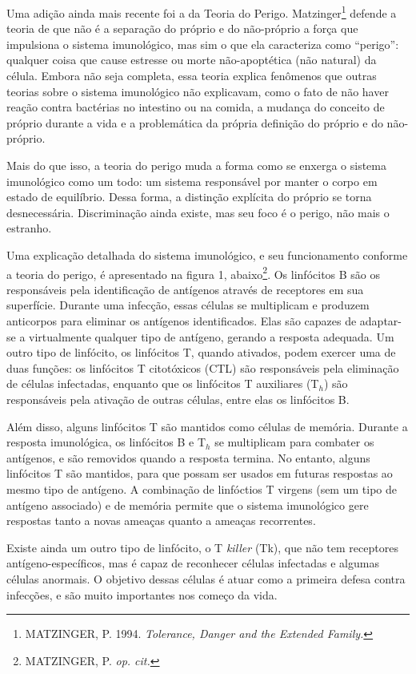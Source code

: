 \documentclass{iiufrgs}
\begin{document}
Uma adição ainda mais recente foi a da Teoria do Perigo. Matzinger\footnote{MATZINGER, P. 1994. \emph{Tolerance, Danger and the Extended Family.}} defende a teoria de que não é a separação do próprio e do não-próprio a força que impulsiona o sistema imunológico, mas sim o que ela caracteriza como ``perigo'': qualquer coisa que cause estresse ou morte não-apoptética (não natural) da célula. Embora não seja completa, essa teoria explica fenômenos que outras teorias sobre o sistema imunológico não explicavam, como o fato de não haver reação contra bactérias no intestino ou na comida, a mudança do conceito de próprio durante a vida e a problemática da própria definição do próprio e do não-próprio.

Mais do que isso, a teoria do perigo muda a forma como se enxerga o sistema imunológico como um todo: um sistema responsável por manter o corpo em estado de equilíbrio. Dessa forma, a distinção explícita do próprio se torna desnecessária. Discriminação ainda existe, mas seu foco é o perigo, não mais o estranho.

Uma explicação detalhada do sistema imunológico, e seu funcionamento conforme a teoria do perigo, é apresentado na figura 1, abaixo\footnote{MATZINGER, P. \emph{op. cit.}}. Os linfócitos B são os responsáveis pela identificação de antígenos através de receptores em sua superfície. Durante uma infecção, essas células se multiplicam e produzem anticorpos para eliminar os antígenos identificados. Elas são capazes de adaptar-se a virtualmente qualquer tipo de antígeno, gerando a resposta adequada. Um outro tipo de linfócito, os linfócitos T, quando ativados, podem exercer uma de duas funções: os linfócitos T citotóxicos (CTL) são responsáveis pela eliminação de células infectadas, enquanto que os linfócitos T auxiliares (T$_{h}$) são responsáveis pela ativação de outras células, entre elas os linfócitos B.

Além disso, alguns linfócitos T são mantidos como células de memória. Durante a resposta imunológica, os linfócitos B e T$_{h}$ se multiplicam para combater os antígenos, e são removidos quando a resposta termina. No entanto, alguns linfócitos T são mantidos, para que possam ser usados em futuras respostas ao mesmo tipo de antígeno. A combinação de linfóctios T virgens (sem um tipo de antígeno associado) e de memória permite que o sistema imunológico gere respostas tanto a novas ameaças quanto a ameaças recorrentes.

Existe ainda um outro tipo de linfócito, o T \emph{killer} (Tk), que não tem receptores antígeno-específicos, mas é capaz de reconhecer células infectadas e algumas células anormais. O objetivo dessas células é atuar como a primeira defesa contra infecções, e são muito importantes nos começo da vida.
\end{document}
